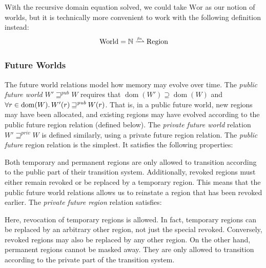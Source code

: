 \documentclass[format=acmsmall, review=false, screen=true]{acmart}
\newcommand{\finparfun}{\xrightharpoonup{\textit{\tiny{fin}}}}
\DeclareMathOperator{\dom}{dom}
\newcommand\lau[1]{{\color{purple} \sf \footnotesize {LS: #1}}\\}
\newcommand\dominique[1]{{\color{purple} \sf \footnotesize {DD: #1}}\\}
\renewcommand\lau[1]{}
\renewcommand\dominique[1]{}
\newcommand{\var}[1]{\mathit{#1}}
\newcommand{\pub}{\var{pub}}
\newcommand{\futurewk}{\mathbin{\sqsupseteq}^{\var{pub}}}
\newcommand{\futurestr}{\mathbin{\sqsupseteq}^{\var{priv}}}
\newcommand{\plaindom}[1]{\mathrm{#1}}
\newcommand{\nats}{\mathbb{N}}
\newcommand{\Regions}{\plaindom{Region}}
\newcommand{\Worlds}{\plaindom{World}}
\newcommand{\Wor}{\plaindom{Wor}}
\newcommand{\plainview}[1]{\mathrm{#1}}
\newcommand{\temp}{\plainview{temp}}
\newcommand{\revoked}{\plainview{revoked}}
\begin{document}
With the recursive domain equation solved, we could take $\Wor$ as our notion of
worlds, but it is technically more convenient to work with the following
definition instead:
\[
  \Worlds = \nats \finparfun \Regions
\]

\subsubsection{Future Worlds}
\label{subsec:future-worlds} 
The future world relations model how memory may evolve over time. 
The \emph{public future world} $W' \futurewk W$ requires that $\dom(W') \supseteq
\dom(W)$ and $\forall r \in \dom(W) \ldotp W'(r) \futurewk W(r)$. That is, in a
public future world, new regions may have been allocated, and existing regions
may have evolved according to the public future region relation (defined below).
The \emph{private future world} relation $W' \futurestr W$ is defined similarly,
using a private future region relation. The \emph{public future} region relation is the simplest. It satisfies
the following properties:
Both temporary and permanent regions are only allowed to transition according to
the public part of their transition system. Additionally, revoked regions must
either remain revoked or be replaced by a temporary region. This means that the
public future world relations allows us to reinstate a region that has been revoked
earlier. The \emph{private future region} relation satisfies:
Here, revocation of temporary regions is allowed. In fact, temporary regions can
be replaced by an arbitrary other region, not just the special $\revoked$.
Conversely, $\revoked$ regions may also be replaced by any other region. On
the other hand, permanent regions cannot be masked away. They are only allowed
to transition according to the private part of the transition system.
\end{document}
